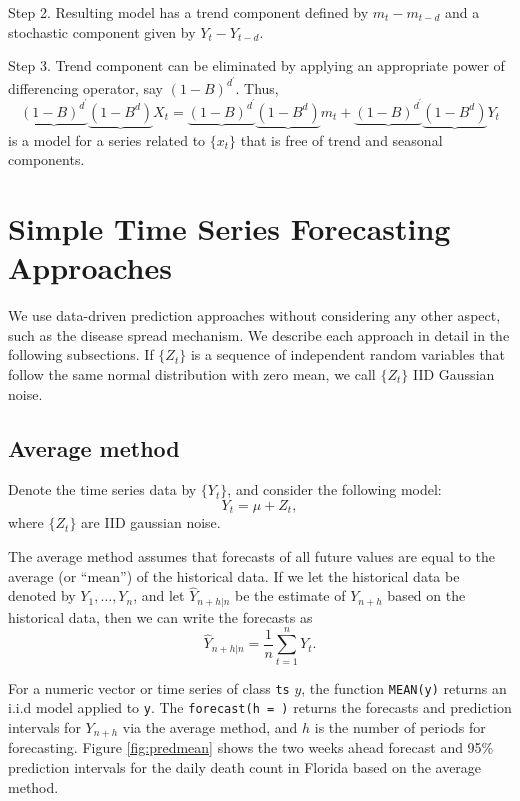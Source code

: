\documentclass[]{book}
\begin{document}
Step 2. Resulting model has a trend component defined by \(m_t-m_{t-d}\)
and a stochastic component given by \(Y_t-Y_{t-d}\).

Step 3. Trend component can be eliminated by applying an appropriate
power of differencing operator, say \((1-B)^{d^{\prime}}\). Thus, \[
  \underbrace{(1-B)^{d^{\prime}}}{}\underbrace{(1-B^d)}{}X_t
  =\underbrace{(1-B)^{d^{\prime}}}{}\underbrace{(1-B^d)}{}m_t
  +\underbrace{(1-B)^{d^{\prime}}}{}\underbrace{(1-B^d)}{}Y_t
\] is a model for a series related to \(\{x_t\}\) that is free of trend
and seasonal components.

\section{Simple Time Series Forecasting
Approaches}\label{simple-time-series-forecasting-approaches}

We use data-driven prediction approaches without considering any other
aspect, such as the disease spread mechanism. We describe each approach
in detail in the following subsections. If \(\{Z_t\}\) is a sequence of
independent random variables that follow the same normal distribution
with zero mean, we call \(\{Z_t\}\) IID Gaussian noise.

\subsection{Average method}\label{average-method}

Denote the time series data by \(\{Y_t\}\), and consider the following
model: \[
Y_t=\mu+Z_t, 
\] where \(\{Z_t\}\) are IID gaussian noise.

The average method assumes that forecasts of all future values are equal
to the average (or ``mean'') of the historical data. If we let the
historical data be denoted by \(Y_1,\ldots,Y_n\), and let
\(\hat{Y}_{n+h|n}\) be the estimate of \(Y_{n+h}\) based on the
historical data, then we can write the forecasts as \[
\hat{Y}_{n+h|n}=\frac{1}{n}\sum_{t=1}^n Y_t.
\]

For a numeric vector or time series of class \texttt{ts} \(y\), the
function \texttt{MEAN(y)} returns an i.i.d model applied to \texttt{y}.
The \texttt{forecast(h\ =\ )} returns the forecasts and prediction
intervals for \(Y_{n+h}\) via the average method, and \(h\) is the
number of periods for forecasting. Figure \ref{fig:predmean} shows the
two weeks ahead forecast and 95\% prediction intervals for the daily
death count in Florida based on the average method.
\end{document}
